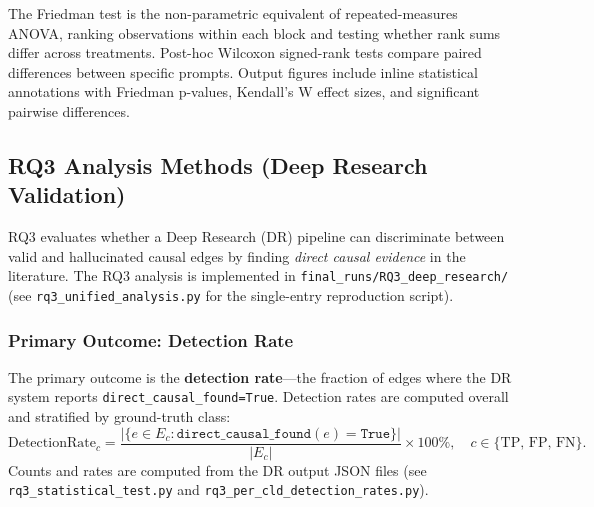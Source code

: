 The Friedman test is the non-parametric equivalent of repeated-measures ANOVA, ranking observations within each block and testing whether rank sums differ across treatments. Post-hoc Wilcoxon signed-rank tests compare paired differences between specific prompts. Output figures include inline statistical annotations with Friedman p-values, Kendall's W effect sizes, and significant pairwise differences.

\subsection{RQ3 Analysis Methods (Deep Research Validation)}
\label{sec:rq3_analysis_methods}

RQ3 evaluates whether a Deep Research (DR) pipeline can discriminate between valid and hallucinated causal edges by finding \textit{direct causal evidence} in the literature. The RQ3 analysis is implemented in \texttt{final\_runs/RQ3\_deep\_research/} (see \texttt{rq3\_unified\_analysis.py} for the single-entry reproduction script).

\subsubsection{Primary Outcome: Detection Rate}
The primary outcome is the \textbf{detection rate}---the fraction of edges where the DR system reports \texttt{direct\_causal\_found=True}. Detection rates are computed overall and stratified by ground-truth class:
\[
\text{DetectionRate}_{c}=\frac{|\{e \in E_c : \texttt{direct\_causal\_found}(e)=\texttt{True}\}|}{|E_c|}\times 100\%,
\quad c\in\{\text{TP, FP, FN}\}.
\]
Counts and rates are computed from the DR output JSON files (see \texttt{rq3\_statistical\_test.py} and \texttt{rq3\_per\_cld\_detection\_rates.py}).

